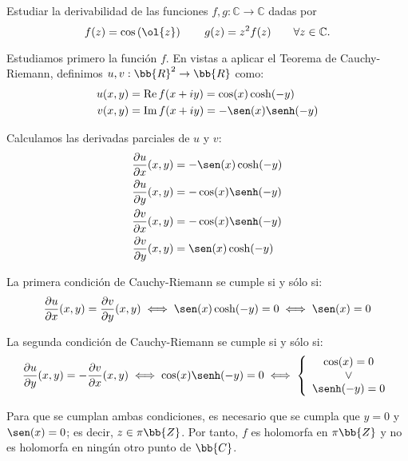 \documentclass[12pt]{article}
\renewcommand{\Re}{\operatorname{Re}} %
\renewcommand{\Im}{\operatorname{Im}}
\begin{document}
    \begin{ejercicio}[3.5 puntos]
        Estudiar la derivabilidad de las funciones $f , g : \mathbb{C} \to \mathbb{C}$ dadas por
        \[
            f(z) = \cos\left(\ol{z}\right)\qquad g(z) = z^2f(z)\qquad \forall z \in \mathbb{C}.
        \]

        Estudiamos primero la función $f$. En vistas a aplicar el Teorema de Cauchy-Riemann, definimos $u, v : \bb{R}^2 \to \bb{R}$ como:
        \begin{align*}
            u(x,y) &= \Re f(x+iy) = \cos(x)\cosh(-y) \\
            v(x,y) &= \Im f(x+iy) = -\sen(x)\senh(-y)
        \end{align*}

        Calculamos las derivadas parciales de $u$ y $v$:
        \begin{align*}
            \frac{\partial u}{\partial x}(x,y) &= -\sen(x)\cosh(-y) \\
            \frac{\partial u}{\partial y}(x,y) &= -\cos(x)\senh(-y) \\
            \frac{\partial v}{\partial x}(x,y) &= -\cos(x)\senh(-y) \\
            \frac{\partial v}{\partial y}(x,y) &= \sen(x)\cosh(-y)
        \end{align*}

        La primera condición de Cauchy-Riemann se cumple si y sólo si:
        \begin{align*}
            \frac{\partial u}{\partial x}(x,y) = \frac{\partial v}{\partial y}(x,y) \iff \sen(x)\cosh(-y) =  0 \iff \sen(x) = 0
        \end{align*}

        La segunda condición de Cauchy-Riemann se cumple si y sólo si:
        \begin{align*}
            \frac{\partial u}{\partial y}(x,y) = -\frac{\partial v}{\partial x}(x,y) \iff \cos(x)\senh(-y) = 0 \iff \left\{
            \begin{array}{c}
                \cos(x) = 0 \\
                \lor\\
                \senh(-y) = 0
            \end{array}
            \right.
        \end{align*}

        Para que se cumplan ambas condiciones, es necesario que se cumpla que $y=0$ y $\sen(x) = 0$; es decir, $z\in \pi\bb{Z}$. Por tanto, $f$ es holomorfa en $\pi\bb{Z}$ y no es holomorfa en ningún otro punto de $\bb{C}$.\\


\end{ejercicio}
\end{document}
